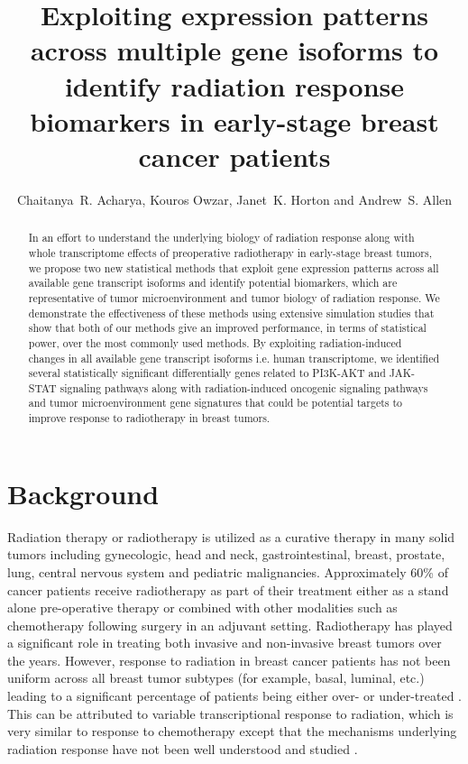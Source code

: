 \documentclass[hidelinks,11pt]{article}
\title{Exploiting expression patterns across multiple gene isoforms to identify radiation response biomarkers in early-stage breast cancer patients}
\author{Chaitanya~R. Acharya, Kouros Owzar, Janet~K. Horton and Andrew~S. Allen}
\date{}
\begin{document}
\maketitle



\begin{abstract}
In an effort to understand the underlying biology of radiation response along with whole transcriptome effects of preoperative radiotherapy in early-stage breast tumors, we propose two new statistical methods that exploit gene expression patterns across all available gene transcript isoforms and identify potential biomarkers, which are representative of tumor microenvironment and tumor biology of radiation response. We demonstrate the effectiveness of these methods using extensive simulation studies that show that both of our methods give an improved performance, in terms of statistical power, over the most commonly used methods. By exploiting radiation-induced changes in all available gene transcript isoforms i.e. human transcriptome, we identified several statistically significant differentially genes related to PI3K-AKT and JAK-STAT signaling pathways along with radiation-induced oncogenic signaling pathways and tumor microenvironment gene signatures that could be potential targets to improve response to radiotherapy in breast tumors. 
\end{abstract}

\section*{Background}

Radiation therapy or radiotherapy is utilized as a curative therapy in many solid tumors including gynecologic, head and neck, gastrointestinal, breast, prostate, lung, central nervous system and pediatric malignancies. Approximately 60\% of cancer patients receive radiotherapy as part of their treatment either as a stand alone pre-operative therapy or combined with other modalities such as chemotherapy following surgery in an adjuvant setting. Radiotherapy has played a significant role in treating both invasive and non-invasive breast tumors over the years. However, response to radiation in breast cancer patients has not been uniform across all breast tumor subtypes (for example, basal, luminal, etc.) leading to a significant percentage of patients being either over- or under-treated \cite{fas,subtypes_rad}. This can be attributed to variable transcriptional response to radiation, which is very similar to response to chemotherapy except that the mechanisms underlying radiation response have not been well understood and studied \cite{Macaeva,Wushou2015}. 
\end{document}
